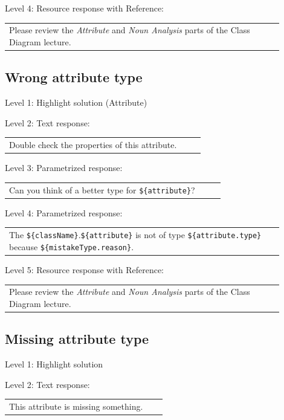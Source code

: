 \noindent Level 4: Resource response with Reference: \medskip

\begin{tabular}{|p{0.9\linewidth}}
Please review the \textit{Attribute} and \textit{Noun Analysis} parts of the Class Diagram lecture.
\end{tabular} \medskip


\subsection{Wrong attribute type}

\noindent Level 1: Highlight solution (Attribute) \medskip

\noindent Level 2: Text response: \medskip

\begin{tabular}{|p{0.9\linewidth}}
Double check the properties of this attribute.
\end{tabular} \medskip

\noindent Level 3: Parametrized response: \medskip

\begin{tabular}{|p{0.9\linewidth}}
Can you think of a better type for \verb|${attribute}|?
\end{tabular} \medskip

\noindent Level 4: Parametrized response: \medskip

\begin{tabular}{|p{0.9\linewidth}}
The \verb|${className}|.\verb|${attribute}| is not of type \verb|${attribute.type}| because \verb|${mistakeType.reason}|.
\end{tabular} \medskip

\noindent Level 5: Resource response with Reference: \medskip

\begin{tabular}{|p{0.9\linewidth}}
Please review the \textit{Attribute} and \textit{Noun Analysis} parts of the Class Diagram lecture.
\end{tabular} \medskip


\subsection{Missing attribute type}

\noindent Level 1: Highlight solution  \medskip

\noindent Level 2: Text response: \medskip

\begin{tabular}{|p{0.9\linewidth}}
This attribute is missing something.
\end{tabular} \medskip

